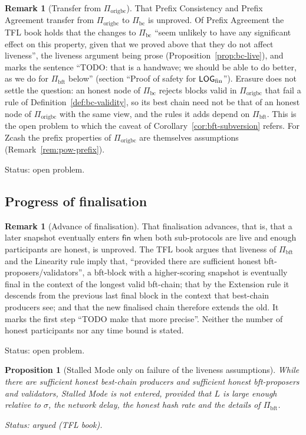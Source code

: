 \documentclass[11pt,a4paper]{article}
\newtheorem{proposition}[theorem]{Proposition}
\theoremstyle{definition}
\newtheorem{remark}[theorem]{Remark}
\newcommand{\bc}{\mathrm{bc}}
\newcommand{\bft}{\mathrm{bft}}
\newcommand{\Piorigbc}{\Pi_{\mathrm{origbc}}}
\newcommand{\Pibc}{\Pi_{\bc}}
\newcommand{\Pibft}{\Pi_{\bft}}
\newcommand{\fin}{\mathsf{fin}}
\begin{document}
\begin{remark}[Transfer from $\Piorigbc$]\label{rem:origbc-transfer}
That Prefix Consistency and Prefix Agreement transfer from $\Piorigbc$ to
$\Pibc$ is unproved. Of Prefix Agreement the TFL book holds that the changes
to $\Pibc$ ``seem unlikely to have any significant effect on this property,
given that we proved above that they do not affect liveness'', the liveness
argument being prose (Proposition~\ref{prop:bc-live}), and marks the sentence
``TODO: that is a handwave; we should be able to do better, as we do for
$\Pibft$ below'' (section ``Proof of safety for $\LOGfin$''). Erasure does
not settle the question: an honest node of $\Pibc$ rejects blocks valid in
$\Piorigbc$ that fail a rule of Definition~\ref{def:bc-validity}, so its
best chain need not be that of an honest node of $\Piorigbc$ with the same
view, and the rules it adds depend on $\Pibft$. This is the open problem to
which the caveat of Corollary~\ref{cor:bft-subversion} refers. For Zcash the
prefix properties of $\Piorigbc$ are themselves assumptions
(Remark~\ref{rem:pow-prefix}).

Status: open problem.
\end{remark}

\subsection{Progress of finalisation}\label{sec:live-fin}

\begin{remark}[Advance of finalisation]\label{rem:fin-advances}
That finalisation advances, that is, that a later snapshot eventually
enters $\fin$ when both sub-protocols are live and enough participants are
honest, is unproved. The TFL book argues that liveness of $\Pibft$ and the
Linearity rule imply that, ``provided there are sufficient honest
bft-proposers/validators'', a bft-block with a higher-scoring snapshot is
eventually final in the context of the longest valid bft-chain; that by the
Extension rule it descends from the previous last final block in the
context that best-chain producers see; and that the new finalised chain
therefore extends the old. It marks the first step ``TODO make that more
precise''. Neither the number of honest participants nor any time bound is
stated.

Status: open problem.
\end{remark}

\begin{proposition}[Stalled Mode only on failure of the liveness
assumptions]\label{prop:stall-only}
While there are sufficient honest best-chain producers and sufficient honest
bft-proposers and validators, Stalled Mode is not entered, provided that $L$
is large enough relative to $\sigma$, the network delay, the honest hash rate
and the details of $\Pibft$.

Status: argued (TFL book).
\end{proposition}
\end{document}
